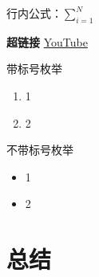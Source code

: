 \documentclass[UTF8,a4paper,10pt]{ctexart}
\newcommand{\xiaosi}{\fontsize{12pt}{18pt}\selectfont}            %
\begin{document}
行内公式：$\sum^N_{i=1}$

\textbf{超链接}  \href{http://youtube.com/}{YouTube}

带标号枚举
\begin{enumerate}
  \item 1
  \item 2
\end{enumerate}

不带标号枚举
\begin{itemize}
  \item 1
  \item 2
\end{itemize}

\xiaosi{切换字体大小}

\section{总结}

\newpage

 
\end{document}

